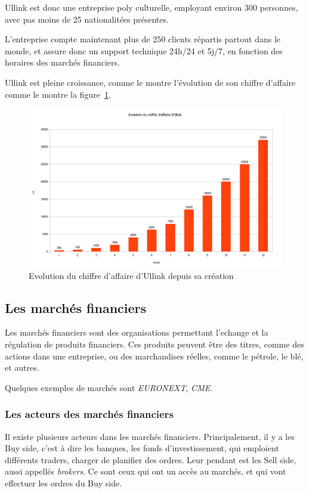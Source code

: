 \documentclass[a4paper, 12pt]{article}
\begin{document}
Ullink est donc une entreprise poly culturelle, employant environ 300 personnes, avec pas moins de 25 nationalitées présentes.

L'entreprise compte maintenant plus de 250 clients répartis partout dans le monde, et assure donc un support technique 24h/24 et 5j/7, en fonction des horaires des marchés financiers.

Ullink est pleine croissance, comme le montre l'évolution de son chiffre d'affaire comme le montre la figure~\ref{ca_ullink}.

\begin{figure}
\includegraphics[width=\textwidth]{ca_ullink.png}
\caption{Evolution du chiffre d'affaire d'Ullink depuis sa création}
\label{ca_ullink}
\end{figure}

\subsection{Les marchés financiers}

Les marchés financiers sont des organisations permettant l'echange et la régulation de produits financiers. Ces produits peuvent être des titres, comme des actions dans une entreprise, ou des marchandises réelles, comme le pétrole, le blé, et autres.

Quelques exemples de marchés sont \emph{EURONEXT}, \emph{CME}.

\subsubsection{Les acteurs des marchés financiers}

Il existe plusieurs acteurs dans les marchés financiers. Principalement, il y a les Buy side, c'est à dire les banques, les fonds d'investissement, qui emploient différents traders, charger de planifier des ordres. Leur pendant est les Sell side, aussi appellés \emph{brokers}. Ce sont ceux qui ont un accès au marchés, et qui vont effectuer les ordres du Buy side.
\end{document}
